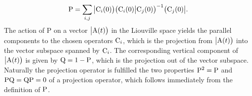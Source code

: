 %
\begin{align}
	\mathrm{P} = \sum\limits_{i,j} \big|{\mathrm{C}_{i}(0)}\big) \big({\mathrm{C}_{i}(0)}\big|{\mathrm{C}_{j}(0)}\big)^{-1} \big({\mathrm{C}_{j}(0)}\big|.
	\label{eq:projection operator2.0}
\end{align}
%
The action of P on a vector $\big|{\mathrm{A}(t)}\big)$ in the Liouville space yields the parallel components to the chosen operators $\mathrm{C}_{i}$, which is the projection from $\big|{\mathrm{A}(t)}\big)$ into the vector subspace spanned by $\mathrm{C}_{i}$. 
The corresponding vertical component of $\big|{\mathrm{A}(t)}\big)$ is given by $\mathrm{Q} = 1- \mathrm{P}$, which is the projection out of the vector subspace.
Naturally the projection operator is fulfilled the two properties $\mathrm{P}^{2} = \mathrm{P}$ and $\mathrm{PQ} = \mathrm{QP} = 0$ of a projection operator, which follows immediately from the definition of $\mathrm{P}$.

